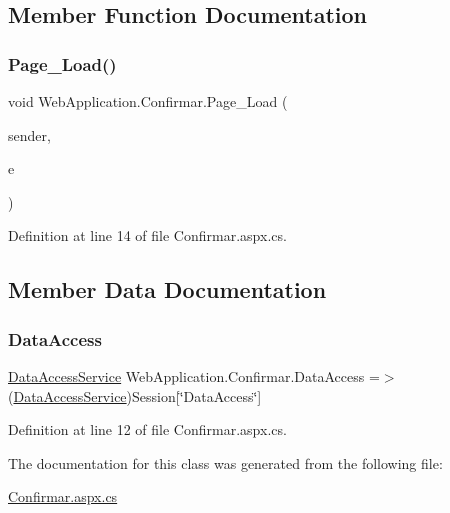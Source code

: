 \subsection{Member Function Documentation}
\mbox{\label{classWebApplication_1_1Confirmar_a0ba1fd0d9bb4844635cf79b6762cb42b}} 
\subsubsection{\texorpdfstring{Page\_Load()}{Page\_Load()}}
{\footnotesize\ttfamily void Web\+Application.\+Confirmar.\+Page\+\_\+\+Load (\begin{DoxyParamCaption}\item[{object}]{sender,  }\item[{Event\+Args}]{e }\end{DoxyParamCaption})\hspace{0.3cm}{\ttfamily [protected]}}



Definition at line 14 of file Confirmar.\+aspx.\+cs.



\subsection{Member Data Documentation}
\mbox{\label{classWebApplication_1_1Confirmar_ac2223a11ebcaa342108a44f9c8277855}} 
\subsubsection{\texorpdfstring{DataAccess}{DataAccess}}
{\footnotesize\ttfamily \mbox{\hyperlink{classDataBaseAccess_1_1DataAccessService}{Data\+Access\+Service}} Web\+Application.\+Confirmar.\+Data\+Access =$>$ (\mbox{\hyperlink{classDataBaseAccess_1_1DataAccessService}{Data\+Access\+Service}})Session\mbox{[}\char`\"{}Data\+Access\char`\"{}\mbox{]}\hspace{0.3cm}{\ttfamily [private]}}



Definition at line 12 of file Confirmar.\+aspx.\+cs.



The documentation for this class was generated from the following file\+:\begin{DoxyCompactItemize}
\item 
\mbox{\hyperlink{Confirmar_8aspx_8cs}{Confirmar.\+aspx.\+cs}}\end{DoxyCompactItemize}
